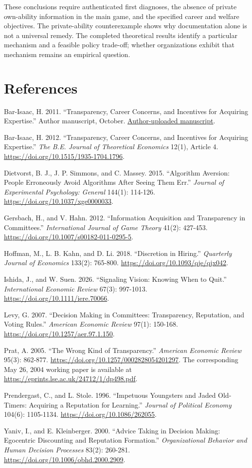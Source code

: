 \documentclass[
  11pt,
]{article}
\begin{document}
These conclusions require authenticated first diagnoses, the absence of
private own-ability information in the main game, and the specified
career and welfare objectives. The private-ability counterexample shows
why documentation alone is not a universal remedy. The completed
theoretical results identify a particular mechanism and a feasible
policy trade-off; whether organizations exhibit that mechanism remains
an empirical question.


{
\small
\setlength{\parindent}{0pt}
\section*{References}\label{references}

Bar-Isaac, H. 2011. ``Transparency, Career Concerns, and Incentives for
Acquiring Expertise.'' Author manuscript, October.
\href{https://www.researchgate.net/publication/227378148_Transparency_Career_Concerns_and_Incentives_for_Acquiring_Expertise}{Author-uploaded
manuscript}.

Bar-Isaac, H. 2012. ``Transparency, Career Concerns, and Incentives for
Acquiring Expertise.'' \emph{The B.E. Journal of Theoretical Economics}
12(1), Article 4. \url{https://doi.org/10.1515/1935-1704.1796}.

Dietvorst, B. J., J. P. Simmons, and C. Massey. 2015. ``Algorithm
Aversion: People Erroneously Avoid Algorithms After Seeing Them Err.''
\emph{Journal of Experimental Psychology: General} 144(1): 114-126.
\url{https://doi.org/10.1037/xge0000033}.

Gersbach, H., and V. Hahn. 2012. ``Information Acquisition and
Transparency in Committees.'' \emph{International Journal of Game
Theory} 41(2): 427-453. \url{https://doi.org/10.1007/s00182-011-0295-5}.

Hoffman, M., L. B. Kahn, and D. Li. 2018. ``Discretion in Hiring.''
\emph{Quarterly Journal of Economics} 133(2): 765-800.
\url{https://doi.org/10.1093/qje/qjx042}.

Ishida, J., and W. Suen. 2026. ``Signaling Vision: Knowing When to
Quit.'' \emph{International Economic Review} 67(3): 997-1013.
\url{https://doi.org/10.1111/iere.70066}.

Levy, G. 2007. ``Decision Making in Committees: Transparency,
Reputation, and Voting Rules.'' \emph{American Economic Review} 97(1):
150-168. \url{https://doi.org/10.1257/aer.97.1.150}.

Prat, A. 2005. ``The Wrong Kind of Transparency.'' \emph{American
Economic Review} 95(3): 862-877.
\url{https://doi.org/10.1257/0002828054201297}. The corresponding May 26, 2004
working paper is available at
\url{https://eprints.lse.ac.uk/24712/1/dp498.pdf}.

Prendergast, C., and L. Stole. 1996. ``Impetuous Youngsters and Jaded
Old-Timers: Acquiring a Reputation for Learning.'' \emph{Journal of
Political Economy} 104(6): 1105-1134. \url{https://doi.org/10.1086/262055}.

Yaniv, I., and E. Kleinberger. 2000. ``Advice Taking in Decision Making:
Egocentric Discounting and Reputation Formation.'' \emph{Organizational
Behavior and Human Decision Processes} 83(2): 260-281.
\url{https://doi.org/10.1006/obhd.2000.2909}.

}
\clearpage
\end{document}
